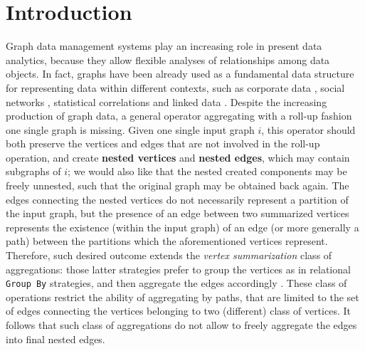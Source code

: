 \section{Introduction}
Graph data management systems play an increasing role in present data analytics, because they allow flexible analyses of relationships among data objects. In fact, graphs have been already used as a fundamental data structure for representing data within different contexts, such as corporate data \cite{success,Park2016355}, social networks \cite{xie,BrodkaK14}, statistical correlations \cite{StatisticalModels} and linked data \cite{Vasilyeva13,BarabucciEARMARK}. Despite the increasing production of graph data, a general operator aggregating with a roll-up fashion one single graph is missing. Given one single input graph $i$, this operator should both preserve the vertices and edges that are not involved in the roll-up operation, and create \textbf{nested vertices} and \textbf{nested edges}, which may contain subgraphs of $i$; we would also like that the nested created components may be freely unnested, such that the original graph may be obtained back again. The edges connecting the nested vertices do not necessarily represent a partition of the input graph, but the presence of an edge between two summarized vertices represents the existence (within the input graph) of an edge (or more generally a path) between the partitions which the aforementioned vertices represent. Therefore, such desired outcome extends the \textit{vertex summarization} class of aggregations: those latter strategies prefer to group the vertices as in relational \texttt{Group By} strategies, and then aggregate the edges accordingly \cite{JunghannsPR17}. These class of operations restrict the ability of aggregating by paths, that are limited to the set of edges connecting the vertices belonging to two (different) class of vertices. It follows that such class of aggregations   do not allow to freely aggregate the edges into final nested edges. 



